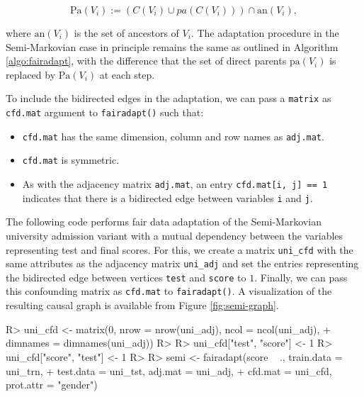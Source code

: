 \documentclass[
  nojss]{jss}
\providecommand{\tightlist}{%
  \setlength{\itemsep}{0pt}\setlength{\parskip}{0pt}}
\begin{document}
\[\mathrm{Pa}(V_i) := (C(V_i) \cup pa(C(V_i))) \cap \mathrm{an}(V_i),\]

where \(\mathrm{an}(V_i)\) is the set of ancestors of \(V_i\). The
adaptation procedure in the Semi-Markovian case in principle remains the
same as outlined in Algorithm \ref{algo:fairadapt}, with the difference
that the set of direct parents \(\mathrm{pa}(V_i)\) is replaced by
\(\mathrm{Pa}(V_i)\) at each step.

To include the bidirected edges in the adaptation, we can pass a
\texttt{matrix} as \texttt{cfd.mat} argument to \texttt{fairadapt()}
such that:

\begin{itemize}
\tightlist
\item
  \texttt{cfd.mat} has the same dimension, column and row names as
  \texttt{adj.mat}.
\item
  \texttt{cfd.mat} is symmetric.
\item
  As with the adjacency matrix \texttt{adj.mat}, an entry
  \texttt{cfd.mat{[}i,\ j{]}\ ==\ 1} indicates that there is a
  bidirected edge between variables \texttt{i} and \texttt{j}.
\end{itemize}

The following code performs fair data adaptation of the Semi-Markovian
university admission variant with a mutual dependency between the
variables representing test and final scores. For this, we create a
matrix \texttt{uni\_cfd} with the same attributes as the adjacency
matrix \texttt{uni\_adj} and set the entries representing the bidirected
edge between vertices \texttt{test} and \texttt{score} to \(1\).
Finally, we can pass this confounding matrix as \texttt{cfd.mat} to
\texttt{fairadapt()}. A visualization of the resulting causal graph is
available from Figure \ref{fig:semi-graph}.

\begin{CodeChunk}
\begin{CodeInput}
R> uni_cfd <- matrix(0, nrow = nrow(uni_adj), ncol = ncol(uni_adj),
+                   dimnames = dimnames(uni_adj))
R> 
R> uni_cfd["test", "score"] <- 1
R> uni_cfd["score", "test"] <- 1
R> 
R> semi <- fairadapt(score ~ ., train.data = uni_trn,
+                   test.data = uni_tst, adj.mat = uni_adj,
+                   cfd.mat = uni_cfd, prot.attr = "gender")
\end{CodeInput}
\end{CodeChunk}
\end{document}
